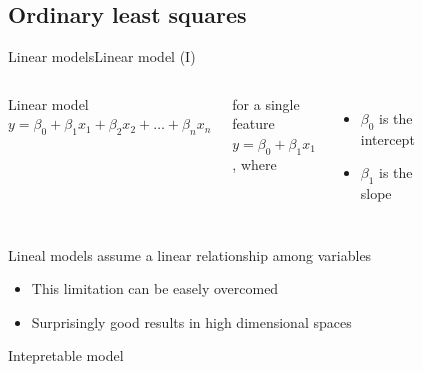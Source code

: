 \documentclass[10pt,compress]{beamer} %
\begin{document}
\subsection{Ordinary least squares}
\begin{frame}{Linear models}{Linear model (I)}
    \begin{columns}
        \begin{block}{Linear model}
            $y = \beta_0 + \beta_1 x_1  + \beta_2 x_2 + \dots + \beta_n x_n$
        \end{block}
        
        for a single feature $y = \beta_0 + \beta_1 x_1$, where
        \begin{itemize}
            \item $\beta_0$ is the intercept
            \item $\beta_1$ is the slope
        \end{itemize}

		\begin{figure}
	        \includegraphics[width=\textwidth]{figs/regression.png}
		\end{figure}
    \end{columns}

    \bigskip

    Lineal models assume a linear relationship among variables
	\begin{itemize}
		\item This limitation can be easely overcomed
		\item Surprisingly good results in high dimensional spaces
	\end{itemize}
    Intepretable model
\end{frame}
\end{document}
